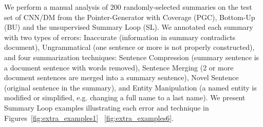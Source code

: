 \documentclass[11pt,a4paper]{article}
\begin{document}
\begin{table}[]
    \caption{Error and Technique analysis on 200 randomly selected summaries on the CNN/DM test-set for the Point-Gen with Cov. (PGC), Bottom-Up (BU) and unsupervised Summary Loop (SL). For each summarization technique, we report two numbers: the number of successful occurrences in summaries with no error, and the total number of occurrences in the 200 summaries.}
    \label{table:error_and_technique_analysis}
\end{table}

We perform a manual analysis of 200 randomly-selected summaries on the test set of CNN/DM from the Pointer-Generator with Coverage (PGC), Bottom-Up (BU) and the unsupervised Summary Loop (SL). We annotated each summary with two types of errors: Inaccurate (information in summary contradicts document), Ungrammatical (one sentence or more is not properly constructed), and four summarization techniques: Sentence Compression (summary sentence is a document sentence with words removed), Sentence Merging (2 or more document sentences are merged into a summary sentence), Novel Sentence (original sentence in the summary), and Entity Manipulation (a named entity is modified or simplified, e.g. changing a full name to a last name). We present Summary Loop examples illustrating each error and technique in Figures~\ref{fig:extra_examples1} \textendash~\ref{fig:extra_examples6}.
\end{document}

